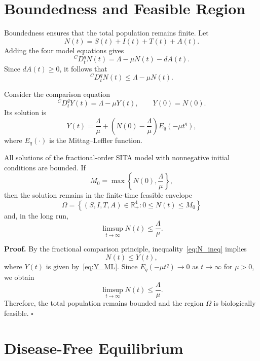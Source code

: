 \documentclass[12pt,a4paper,oneside]{report}
\newcommand{\CaputoD}[2]{{}^{C}D_{#1}^{#2}}
\begin{document}
\section{Boundedness and Feasible Region}

Boundedness ensures that the total population remains finite. Let
\[
N(t)=S(t)+I(t)+T(t)+A(t).
\]
Adding the four model equations gives
\begin{equation}
\CaputoD{t}{q}N(t)=\Lambda-\mu N(t)-dA(t).
\label{eq:caputo_N}
\end{equation}
Since $dA(t)\geq0$, it follows that
\begin{equation}
\CaputoD{t}{q}N(t)\leq \Lambda-\mu N(t).
\label{eq:N_ineq}
\end{equation}

Consider the comparison equation
\[
\CaputoD{t}{q}Y(t)=\Lambda-\mu Y(t),\qquad Y(0)=N(0).
\]
Its solution is
\begin{equation}
Y(t)=\frac{\Lambda}{\mu}
+\left(N(0)-\frac{\Lambda}{\mu}\right)E_q(-\mu t^q),
\label{eq:Y_ML}
\end{equation}
where $E_q(\cdot)$ is the Mittag--Leffler function.

\begin{resultbox}[title={Theorem 4.3 --- Boundedness}]
All solutions of the fractional-order SITA model with nonnegative initial conditions are bounded. If
\[
M_0=\max\left\{N(0),\frac{\Lambda}{\mu}\right\},
\]
then the solution remains in the finite-time feasible envelope
\[
\Omega=
\left\{
(S,I,T,A)\in\mathbb{R}_+^4:
0\leq N(t)\leq M_0
\right\}
\]
and, in the long run,
\[
\limsup_{t\to\infty}N(t)\leq\frac{\Lambda}{\mu}.
\]
\end{resultbox}

\noindent\textbf{Proof.}
By the fractional comparison principle, inequality~\eqref{eq:N_ineq} implies
\[
N(t)\leq Y(t),
\]
where $Y(t)$ is given by~\eqref{eq:Y_ML}. Since $E_q(-\mu t^q)\to0$ as $t\to\infty$ for $\mu>0$, we obtain
\[
\limsup_{t\to\infty}N(t)\leq\frac{\Lambda}{\mu}.
\]
Therefore, the total population remains bounded and the region $\Omega$ is biologically feasible. \hfill$\square$

\section{Disease-Free Equilibrium}
\end{document}
